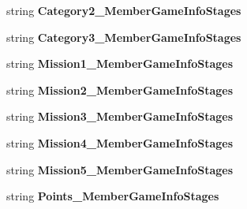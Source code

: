 \begin{DoxyCompactItemize}
\item 
string {\bfseries Category2\+\_\+\+Member\+Game\+Info\+Stages}\hypertarget{a00111_a7c07ab8fb186a93d9cdc5a3173a725e7}{}\label{a00111_a7c07ab8fb186a93d9cdc5a3173a725e7}

\item 
string {\bfseries Category3\+\_\+\+Member\+Game\+Info\+Stages}\hypertarget{a00111_abf8ce5392bc2ea2af65baf78b2980602}{}\label{a00111_abf8ce5392bc2ea2af65baf78b2980602}

\item 
string {\bfseries Mission1\+\_\+\+Member\+Game\+Info\+Stages}\hypertarget{a00111_af2ea2644fd133e3fbd63f7b6283af132}{}\label{a00111_af2ea2644fd133e3fbd63f7b6283af132}

\item 
string {\bfseries Mission2\+\_\+\+Member\+Game\+Info\+Stages}\hypertarget{a00111_ae77594a89f7023c0427862cad3dcef33}{}\label{a00111_ae77594a89f7023c0427862cad3dcef33}

\item 
string {\bfseries Mission3\+\_\+\+Member\+Game\+Info\+Stages}\hypertarget{a00111_ac8074bbe88a9f2a69e139694cf4f0f77}{}\label{a00111_ac8074bbe88a9f2a69e139694cf4f0f77}

\item 
string {\bfseries Mission4\+\_\+\+Member\+Game\+Info\+Stages}\hypertarget{a00111_aa39465472b6c2215c991d7abae1282e8}{}\label{a00111_aa39465472b6c2215c991d7abae1282e8}

\item 
string {\bfseries Mission5\+\_\+\+Member\+Game\+Info\+Stages}\hypertarget{a00111_af470728b46f0c79c749a55b32ab12ffd}{}\label{a00111_af470728b46f0c79c749a55b32ab12ffd}

\item 
string {\bfseries Points\+\_\+\+Member\+Game\+Info\+Stages}\hypertarget{a00111_aa8378af37a2af4e2bceefd4e2a9f6faf}{}\label{a00111_aa8378af37a2af4e2bceefd4e2a9f6faf}


\end{DoxyCompactItemize}
